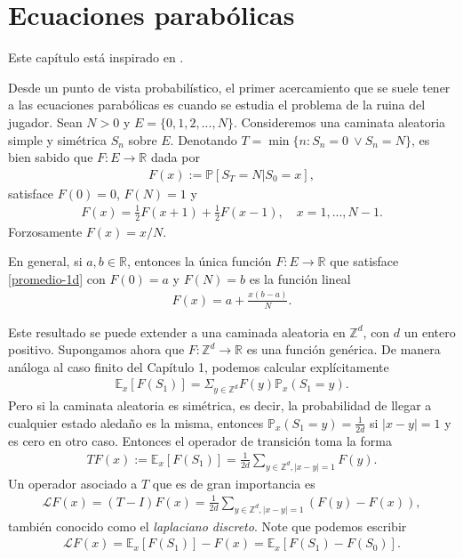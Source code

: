 \documentclass{article}
\numberwithin{equation}{section}
\begin{document}
 
\section{Ecuaciones parabólicas}
Este capítulo está inspirado en 
\cite{lawler2010random}.

Desde un punto de vista probabilístico, el primer acercamiento que se suele tener a las ecuaciones parabólicas es cuando se estudia el problema de la ruina del jugador. Sean $N>0$ y $E = \{0,1,2,...,N\}$. Consideremos una caminata aleatoria simple y simétrica $S_n$ sobre $E$. Denotando $T = \min\{n : S_n = 0 \: \lor S_n = N \}$, es bien sabido que $F : E \to \mathbb{R}$ dada por 
\begin{align*}
    F(x) := \mathbb{P}\left[S_T = N | S_0 = x\right],
\end{align*}
satisface $F(0) = 0$, $F(N) = 1$ y
\begin{align}\label{promedio-1d}
    F(x) = \frac{1}{2}F(x+1)+\frac{1}{2}F(x-1), \quad x=1,...,N-1.
\end{align}
Forzosamente $F(x) = x/N$.


En general, si $a,b \in \mathbb{R}$, entonces la única función $F : E \to \mathbb{R}$ que satisface \eqref{promedio-1d} con $F(0) = a$ y $F(N) = b$ es la función lineal
\begin{align*}
    F(x) = a + \frac{x(b-a)}{N}.
\end{align*}

Este resultado se puede extender a una caminada aleatoria en $\mathbb{Z}^d$, con $d$ un entero positivo. Supongamos ahora que $F : \mathbb{Z}^d \to \mathbb{R}$ es una función genérica. De manera análoga al caso finito del Capítulo 1, podemos calcular explícitamente
\begin{align*}
    \mathbb{E}_x\left[F(S_1)\right] = \Sigma_{y \in \mathbb{Z}^d}F(y)\mathbb{P}_x(S_1 = y).
\end{align*}
Pero si la caminata aleatoria es simétrica, es decir, la probabilidad de llegar a cualquier estado aledaño es la misma, entonces $\mathbb{P}_x(S_1 = y) = \frac{1}{2d}$ si $|x-y| = 1$ y es cero en otro caso. Entonces el operador de transición toma la forma
\begin{align*}
    TF(x) := \mathbb{E}_x\left[F(S_1)\right] = \frac{1}{2d}\sum_{y \in \mathbb{Z}^d, |x-y| = 1}F(y).
\end{align*}
Un operador asociado a $T$ que es de gran importancia es 
\begin{align}
    \mathcal{L}F(x) = (T-I)F(x) = \frac{1}{2d}\sum_{y \in \mathbb{Z}^d, |x-y|=1}(F(y)-F(x)),
\end{align}
también conocido como el \emph{laplaciano discreto}. Note que podemos escribir 
\begin{align}
    \mathcal{L}F(x) = \mathbb{E}_x\left[F(S_1)\right] - F(x) =  \mathbb{E}_x\left[F(S_1)-F(S_0)\right].
\end{align}
\end{document}
